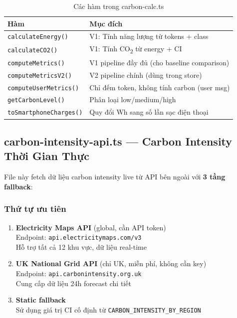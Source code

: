 \documentclass[12pt,a4paper]{article}
\begin{document}
\begin{table}[h]
    \centering
    \begin{tabular}{lp{8cm}}
        \toprule
        \textbf{Hàm} & \textbf{Mục đích} \\
        \midrule
        \texttt{calculateEnergy()} & V1: Tính năng lượng từ tokens + class \\
        \texttt{calculateCO2()} & V1: Tính CO\textsubscript{2} từ energy + CI \\
        \texttt{computeMetrics()} & V1 pipeline đầy đủ (cho baseline comparison) \\
        \texttt{computeMetricsV2()} & V2 pipeline chính (dùng trong store) \\
        \texttt{computeUserMetrics()} & Chỉ đếm token, không tính carbon (user msg) \\
        \texttt{getCarbonLevel()} & Phân loại low/medium/high \\
        \texttt{toSmartphoneCharges()} & Quy đổi Wh sang số lần sạc điện thoại \\
        \bottomrule
    \end{tabular}
    \caption{Các hàm trong carbon-calc.ts}
\end{table}

\subsection{carbon-intensity-api.ts — Carbon Intensity Thời Gian Thực}

File này fetch dữ liệu carbon intensity live từ API bên ngoài với \textbf{3 tầng fallback}:

\subsubsection{Thứ tự ưu tiên}

\begin{enumerate}
    \item \textbf{Electricity Maps API} (global, cần API token) \\
    Endpoint: \texttt{api.electricitymaps.com/v3} \\
    Hỗ trợ tất cả 12 khu vực, dữ liệu real-time

    \item \textbf{UK National Grid API} (chỉ UK, miễn phí, không cần key) \\
    Endpoint: \texttt{api.carbonintensity.org.uk} \\
    Cung cấp dữ liệu 24h forecast chi tiết

    \item \textbf{Static fallback} \\
    Sử dụng giá trị CI cố định từ \texttt{CARBON\_INTENSITY\_BY\_REGION}
\end{enumerate}
\end{document}
